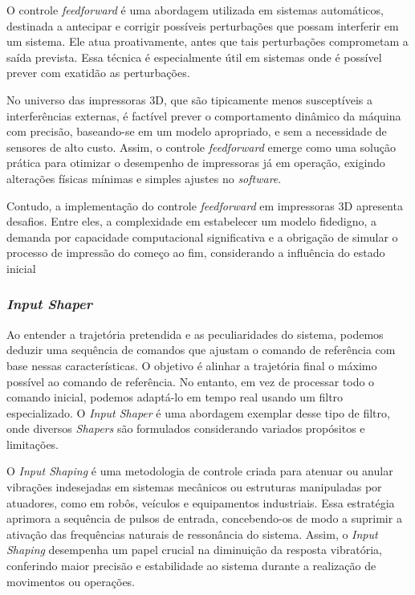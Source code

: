O controle \textit{feedforward} é uma abordagem utilizada em sistemas automáticos, destinada a antecipar e corrigir possíveis perturbações que possam interferir em um sistema. Ele atua proativamente, antes que tais perturbações comprometam a saída prevista. Essa técnica é especialmente útil em sistemas onde é possível prever com exatidão as perturbações.

No universo das impressoras 3D, que são tipicamente menos susceptíveis a interferências externas, é factível prever o comportamento dinâmico da máquina com precisão, baseando-se em um modelo apropriado, e sem a necessidade de sensores de alto custo. Assim, o controle \textit{feedforward} emerge como uma solução prática para otimizar o desempenho de impressoras já em operação, exigindo alterações físicas mínimas e simples ajustes no \textit{software}.

Contudo, a implementação do controle \textit{feedforward} em impressoras 3D apresenta desafios. Entre eles, a complexidade em estabelecer um modelo fidedigno, a demanda por capacidade computacional significativa e a obrigação de simular o processo de impressão do começo ao fim, considerando a influência do estado inicial \cite{ramani20,duan18}

\subsubsection{\textit{Input Shaper}}
Ao entender a trajetória pretendida e as peculiaridades do sistema, podemos deduzir uma sequência de comandos que ajustam o comando de referência com base nessas características. O objetivo é alinhar a trajetória final o máximo possível ao comando de referência. No entanto, em vez de processar todo o comando inicial, podemos adaptá-lo em tempo real usando um filtro especializado. O \textit{Input Shaper} é uma abordagem exemplar desse tipo de filtro, onde diversos \textit{Shapers} são formulados considerando variados propósitos e limitações.

O \textit{Input Shaping} é uma metodologia de controle criada para atenuar ou anular vibrações indesejadas em sistemas mecânicos ou estruturas manipuladas por atuadores, como em robôs, veículos e equipamentos industriais. Essa estratégia aprimora a sequência de pulsos de entrada, concebendo-os de modo a suprimir a ativação das frequências naturais de ressonância do sistema. Assim, o \textit{Input Shaping} desempenha um papel crucial na diminuição da resposta vibratória, conferindo maior precisão e estabilidade ao sistema durante a realização de movimentos ou operações.

